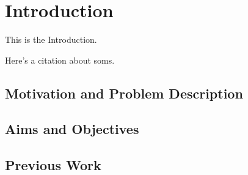 
\section{Introduction}
\label{sec:introduction}
This is the Introduction.

\smallskip

Here's a citation about \glspl{som}\citep{kohonen1990}.

\subsection{Motivation and Problem Description}
\label{subsec:motivation}

\subsection{Aims and Objectives}
\label{subsec:aims}

\subsection{Previous Work}
\label{subsec:previous_work}
